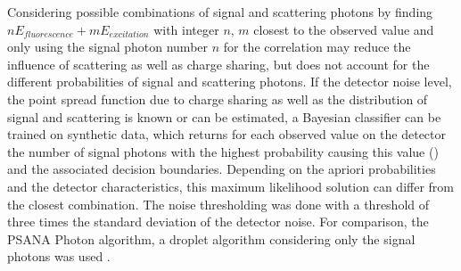Considering possible combinations of signal and scattering photons by finding  $nE_{fluorescence}+mE_{excitation}$ with integer $n$, $m$ closest to the observed value and only using the signal photon number $n$ for the correlation may reduce the influence of scattering as well as charge sharing, but does not account for the different probabilities of signal and scattering photons. If the detector noise level, the point spread function due to charge sharing as well as the distribution of signal and scattering is known or can be estimated, a Bayesian classifier can be trained on synthetic data, which returns for each observed value on the detector the number of signal photons with the highest probability causing this value () and the associated decision boundaries. Depending on the apriori probabilities and the detector characteristics, this maximum likelihood solution can differ from the closest combination. The noise thresholding was done with a threshold of three times the standard deviation of the detector noise. For comparison, the PSANA Photon algorithm, a droplet algorithm considering only the signal photons was used \cite{psana}.

